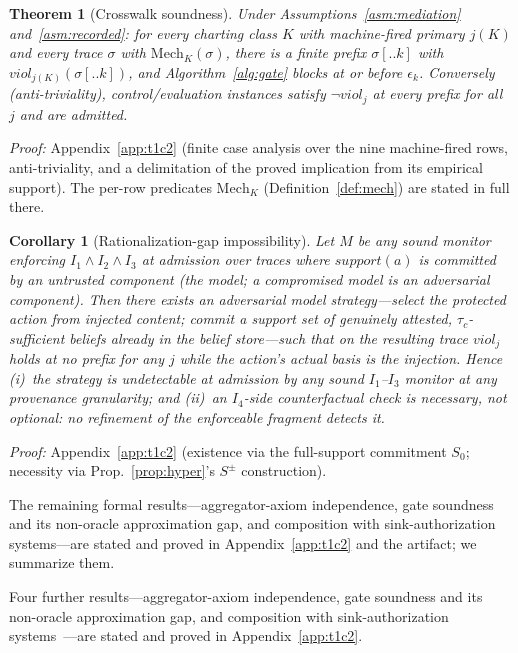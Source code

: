 \documentclass[conference]{IEEEtran}
\newtheorem{corollary}{Corollary}
\newtheorem{theorem}{Theorem}
\newcommand{\Ione}{\ensuremath{I_1}}
\newcommand{\Itwo}{\ensuremath{I_2}}
\newcommand{\Ithree}{\ensuremath{I_3}}
\newcommand{\Ifour}{\ensuremath{I_4}}
\providecommand{\tc}{\tau_{c}}
\begin{document}
\begin{theorem}[Crosswalk soundness]
\label{thm:crosswalk}
Under Assumptions~\ref{asm:mediation} and~\ref{asm:recorded}: for
every charting class $K$ with machine-fired primary $j(K)$ and every
trace $\sigma$ with $\mathrm{Mech}_K(\sigma)$, there is a finite prefix
$\sigma[..k]$ with $\mathit{viol}_{j(K)}(\sigma[..k])$, and
Algorithm~\ref{alg:gate} blocks at or before $\epsilon_k$. Conversely
(anti-triviality), control/evaluation instances satisfy $\neg
\mathit{viol}_j$ at every prefix for all $j$ and are admitted.
\end{theorem}
\noindent\emph{Proof:} Appendix~\ref{app:t1c2} (finite case analysis
over the nine machine-fired rows, anti-triviality, and a delimitation
of the proved implication from its empirical support). The per-row
predicates $\mathrm{Mech}_K$ (Definition~\ref{def:mech}) are stated in
full there.

\begin{corollary}[Rationalization-gap impossibility]
\label{cor:ratgap}
Let $M$ be any sound monitor enforcing $\Ione \wedge \Itwo \wedge
\Ithree$ at admission over traces where $\mathit{support}(a)$ is
committed by an untrusted component (the model; a compromised model is
an adversarial component). Then there exists an adversarial model
strategy---select the protected action from injected content; commit a
support set of genuinely attested, $\tc$-sufficient beliefs already in
the belief store---such that on the resulting trace $\mathit{viol}_j$
holds at no prefix for any $j$ while the action's actual basis is the
injection. Hence (i)~the strategy is undetectable at admission by any
sound $\Ione$--$\Ithree$ monitor at \emph{any} provenance granularity;
and (ii)~an $\Ifour$-side counterfactual check is necessary, not
optional: no refinement of the enforceable fragment detects it.
\end{corollary}
\noindent\emph{Proof:} Appendix~\ref{app:t1c2} (existence via the
full-support commitment $S_0$; necessity via
Prop.~\ref{prop:hyper}'s $S^{\pm}$ construction).

\noindent The remaining formal results---aggregator-axiom independence,
gate soundness and its non-oracle approximation gap, and composition
with sink-authorization systems---are stated and proved in
Appendix~\ref{app:t1c2} and the artifact; we summarize them.

\noindent Four further results---aggregator-axiom independence,
gate soundness and its non-oracle approximation gap, and composition
with sink-authorization systems~\cite{cxi}---are stated and proved in
Appendix~\ref{app:t1c2}.
\end{document}
